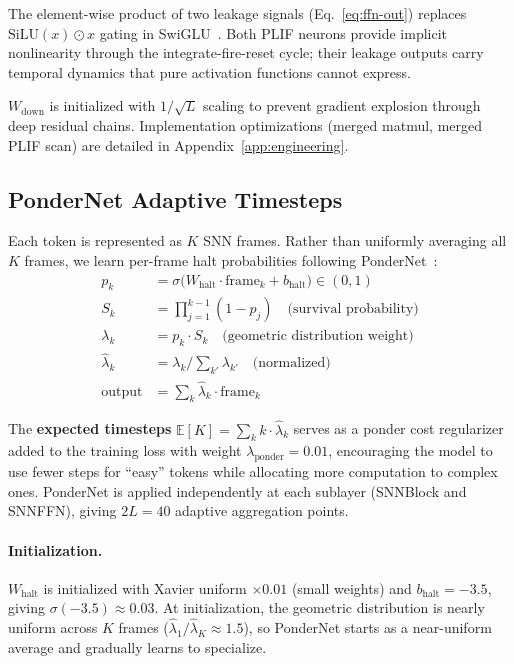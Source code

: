 \documentclass[10pt,twocolumn]{article}
\newcommand{\Expect}{\mathbb{E}}
\begin{document}
The element-wise product of two leakage signals (Eq.~\ref{eq:ffn-out}) replaces $\text{SiLU}(x) \odot x$ gating in SwiGLU~\citep{shazeer2020glu}.
Both PLIF neurons provide implicit nonlinearity through the integrate-fire-reset cycle; their leakage outputs carry temporal dynamics that pure activation functions cannot express.

$W_{\text{down}}$ is initialized with $1/\sqrt{L}$ scaling to prevent gradient explosion through deep residual chains.
Implementation optimizations (merged matmul, merged PLIF scan) are detailed in Appendix~\ref{app:engineering}.


\subsection{PonderNet Adaptive Timesteps}
\label{sec:pondernet}

Each token is represented as $K$ SNN frames.
Rather than uniformly averaging all $K$ frames, we learn per-frame halt probabilities following PonderNet~\citep{banino2021pondernet}:
\begin{align}
    p_k &= \sigma\big(W_{\text{halt}} \cdot \text{frame}_k + b_{\text{halt}}\big) \in (0, 1) \label{eq:ponder-halt} \\
    S_k &= \textstyle\prod_{j=1}^{k-1} (1 - p_j) \quad \text{(survival probability)} \label{eq:ponder-survive} \\
    \lambda_k &= p_k \cdot S_k \quad \text{(geometric distribution weight)} \label{eq:ponder-lambda} \\
    \hat{\lambda}_k &= \lambda_k \big/ \textstyle\sum_{k'} \lambda_{k'} \quad \text{(normalized)} \label{eq:ponder-norm} \\
    \text{output} &= \textstyle\sum_k \hat{\lambda}_k \cdot \text{frame}_k \label{eq:ponder-agg}
\end{align}

The \textbf{expected timesteps} $\Expect[K] = \sum_k k \cdot \hat{\lambda}_k$ serves as a ponder cost regularizer added to the training loss with weight $\lambda_{\text{ponder}} = 0.01$, encouraging the model to use fewer steps for ``easy'' tokens while allocating more computation to complex ones.
PonderNet is applied independently at each sublayer (SNNBlock and SNNFFN), giving $2L = 40$ adaptive aggregation points.

\paragraph{Initialization.}
$W_{\text{halt}}$ is initialized with Xavier uniform $\times 0.01$ (small weights) and $b_{\text{halt}} = -3.5$, giving $\sigma(-3.5) \approx 0.03$.
At initialization, the geometric distribution is nearly uniform across $K$ frames ($\hat\lambda_1 / \hat\lambda_K \approx 1.5$), so PonderNet starts as a near-uniform average and gradually learns to specialize.
\end{document}
